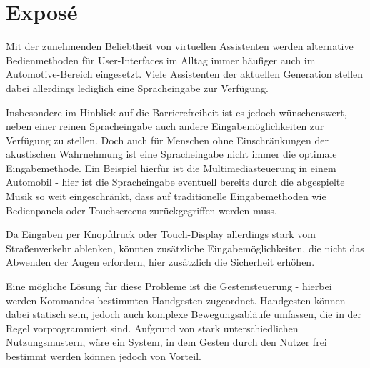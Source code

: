 \documentclass[12pt, a4paper]{book}
\begin{document}
\frontmatter
{}



\mainmatter
\cleardoublepage
{}
{}
\tableofcontents 


\chapter*{Exposé}

Mit der zunehmenden Beliebtheit von virtuellen Assistenten werden alternative Bedienmethoden für User-Interfaces im Alltag immer häufiger auch im Automotive-Bereich eingesetzt. Viele Assistenten der aktuellen Generation stellen dabei allerdings lediglich eine Spracheingabe zur Verfügung.

Insbesondere im Hinblick auf die Barrierefreiheit ist es jedoch wünschenswert, neben einer reinen Spracheingabe auch andere Eingabemöglichkeiten zur Verfügung zu stellen. Doch auch für Menschen ohne Einschränkungen der akustischen Wahrnehmung ist eine Spracheingabe nicht immer die optimale Eingabemethode. Ein Beispiel hierfür ist die Multimediasteuerung in einem Automobil - hier ist die Spracheingabe eventuell bereits durch die abgespielte Musik so weit eingeschränkt, dass auf traditionelle Eingabemethoden wie Bedienpanels oder Touchscreens zurückgegriffen werden muss. 

Da Eingaben per Knopfdruck oder Touch-Display allerdings stark vom Straßenverkehr ablenken, könnten zusätzliche Eingabemöglichkeiten, die nicht das Abwenden der Augen erfordern, hier zusätzlich die Sicherheit erhöhen.

Eine mögliche Lösung für diese Probleme ist die Gestensteuerung - hierbei werden Kommandos bestimmten Handgesten zugeordnet. Handgesten können dabei statisch sein, jedoch auch komplexe Bewegungsabläufe umfassen, die in der Regel vorprogrammiert sind. Aufgrund von stark unterschiedlichen Nutzungsmustern, wäre ein System, in dem Gesten durch den Nutzer frei bestimmt werden können jedoch von Vorteil. 
\end{document}
